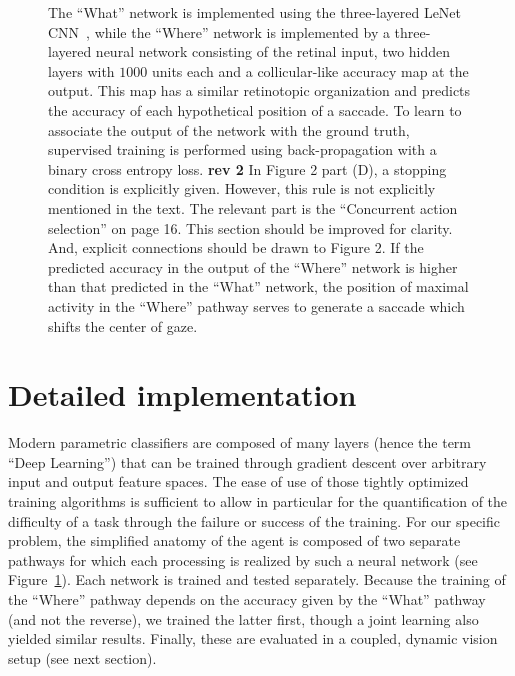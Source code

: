 \begin{figure}[t!]
{		The ``What'' network is implemented using the three-layered LeNet CNN~\cite{Lecun1998}, while the ``Where'' network is implemented by a three-layered neural network consisting of the retinal input, two hidden layers with $1000$ units each and a collicular-like accuracy map at the output.  This map has a similar retinotopic organization and predicts the accuracy of each hypothetical position of a saccade. %
		To learn to associate the output of the network with the ground truth, supervised training is performed using back-propagation with a binary cross entropy loss.
		\D
		{\color{red} \textbf{rev 2} In Figure 2 part (D), a stopping condition is explicitly given. However, this rule is not explicitly mentioned in the text. The relevant part is the “Concurrent action selection” on page 16. This section should be improved for clarity. And, explicit connections should be drawn to Figure 2.}
		If the predicted accuracy in the output of the ``Where'' network is higher than that predicted in the ``What'' network, the position of maximal activity in the ``Where'' pathway serves to generate a saccade which shifts the center of gaze. %
		\label{fig:methods}}%
\end{figure}%

\section*{Detailed implementation}
\label{sec:implementation}

Modern parametric classifiers are composed of many layers (hence the term ``Deep Learning'') that can be trained through gradient descent over arbitrary input and output feature spaces. The ease of use of those tightly optimized training algorithms is sufficient to allow in particular for the quantification of the difficulty of a task through the failure or success of the training.
For our specific problem, the simplified anatomy of the agent is composed of two separate pathways for which each processing is realized by such a neural network (see Figure~\ref{fig:methods}). Each network is trained and tested separately. Because the training of the ``Where'' pathway depends on the accuracy given by the ``What'' pathway (and not the reverse), we trained the latter first, though a joint learning also yielded similar results. %
Finally, these are evaluated in a coupled, dynamic vision setup (see next section).

